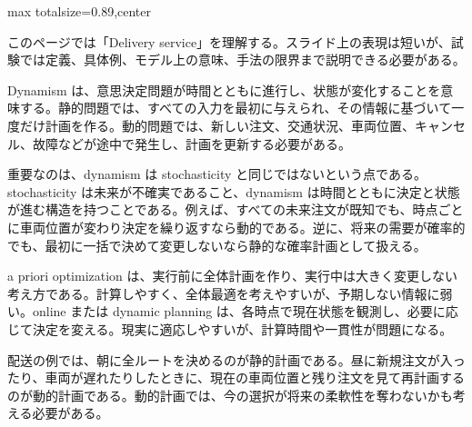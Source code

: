 \begin{minipage}[t]{0.58\textwidth}
\begin{adjustbox}{max totalsize={\textwidth}{0.89\textheight},center}
\begin{minipage}{\textwidth}\scriptsize
{}このページでは「Delivery service」を理解する。スライド上の表現は短いが、試験では定義、具体例、モデル上の意味、手法の限界まで説明できる必要がある。\par
Dynamism は、意思決定問題が時間とともに進行し、状態が変化することを意味する。静的問題では、すべての入力を最初に与えられ、その情報に基づいて一度だけ計画を作る。動的問題では、新しい注文、交通状況、車両位置、キャンセル、故障などが途中で発生し、計画を更新する必要がある。\par
重要なのは、dynamism は stochasticity と同じではないという点である。stochasticity は未来が不確実であること、dynamism は時間とともに決定と状態が進む構造を持つことである。例えば、すべての未来注文が既知でも、時点ごとに車両位置が変わり決定を繰り返すなら動的である。逆に、将来の需要が確率的でも、最初に一括で決めて変更しないなら静的な確率計画として扱える。\par
a priori optimization は、実行前に全体計画を作り、実行中は大きく変更しない考え方である。計算しやすく、全体最適を考えやすいが、予期しない情報に弱い。online または dynamic planning は、各時点で現在状態を観測し、必要に応じて決定を変える。現実に適応しやすいが、計算時間や一貫性が問題になる。\par
配送の例では、朝に全ルートを決めるのが静的計画である。昼に新規注文が入ったり、車両が遅れたりしたときに、現在の車両位置と残り注文を見て再計画するのが動的計画である。動的計画では、今の選択が将来の柔軟性を奪わないかも考える必要がある。\par

\end{minipage}
\end{adjustbox}
\end{minipage}
